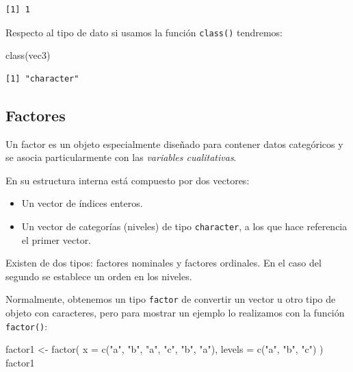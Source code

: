 \documentclass[
  spanish,
  letterpaper,
  DIV=11,
  numbers=noendperiod]{scrreprt}
\newenvironment{Shaded}{\begin{snugshade}}{\end{snugshade}}
\newcommand{\AttributeTok}[1]{\textcolor[rgb]{0.40,0.45,0.13}{#1}}
\newcommand{\FunctionTok}[1]{\textcolor[rgb]{0.28,0.35,0.67}{#1}}
\newcommand{\NormalTok}[1]{\textcolor[rgb]{0.00,0.23,0.31}{#1}}
\newcommand{\OtherTok}[1]{\textcolor[rgb]{0.00,0.23,0.31}{#1}}
\newcommand{\StringTok}[1]{\textcolor[rgb]{0.13,0.47,0.30}{#1}}
\begin{document}
\begin{verbatim}
[1] 1
\end{verbatim}

Respecto al tipo de dato si usamos la función \texttt{class()}
tendremos:

\begin{Shaded}
\begin{Highlighting}[]
\FunctionTok{class}\NormalTok{(vec3)}
\end{Highlighting}
\end{Shaded}

\begin{verbatim}
[1] "character"
\end{verbatim}

\subsection{Factores}\label{factores}

Un factor es un objeto especialmente diseñado para contener datos
categóricos y se asocia particularmente con las \emph{variables
cualitativas}.

En su estructura interna está compuesto por dos vectores:

\begin{itemize}
\item
  Un vector de índices enteros.
\item
  Un vector de categorías (niveles) de tipo \texttt{character}, a los
  que hace referencia el primer vector.
\end{itemize}

Existen de dos tipos: factores nominales y factores ordinales. En el
caso del segundo se establece un orden en los niveles.

Normalmente, obtenemos un tipo \texttt{factor} de convertir un vector u
otro tipo de objeto con caracteres, pero para mostrar un ejemplo lo
realizamos con la función \texttt{factor()}:

\begin{Shaded}
\begin{Highlighting}[]
\NormalTok{factor1 }\OtherTok{\textless{}{-}} \FunctionTok{factor}\NormalTok{(}
  \AttributeTok{x =} \FunctionTok{c}\NormalTok{(}\StringTok{"a"}\NormalTok{, }\StringTok{"b"}\NormalTok{, }\StringTok{"a"}\NormalTok{, }\StringTok{"c"}\NormalTok{, }\StringTok{"b"}\NormalTok{, }\StringTok{"a"}\NormalTok{),}
  \AttributeTok{levels =} \FunctionTok{c}\NormalTok{(}\StringTok{"a"}\NormalTok{, }\StringTok{"b"}\NormalTok{, }\StringTok{"c"}\NormalTok{)}
\NormalTok{)}
\NormalTok{factor1}
\end{Highlighting}
\end{Shaded}
\end{document}
